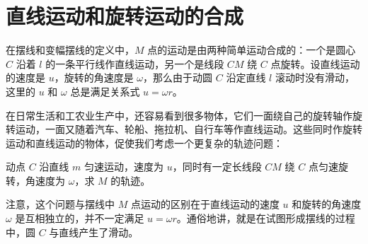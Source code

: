 \section{直线运动和旋转运动的合成}

在摆线和变幅摆线的定义中，$M$ 点的运动是由两种简单运动合成的：一个是圆心 $C$ 沿着 $l$ 的一条平行线作直线运动，另一个是线段 $CM$ 绕 $C$ 点旋转。设直线运动的速度是 $u$，旋转的角速度是 $\omega$，那么由于动圆 $C$ 沿定直线 $l$ 滚动时没有滑动，这里的 $u$ 和 $\omega$ 总是满足关系式 $u = \omega r$。

在日常生活和工农业生产中，还容易看到很多物体，它们一面绕自己的旋转轴作旋转运动，一面又随着汽车、轮船、拖拉机、自行车等作直线运动。这些同时作旋转运动和直线运动的物体，促使我们考虑一个更复杂的轨迹问题：

动点 $C$ 沿直线 $m$ 匀速运动，速度为 $u$，同时有一定长线段 $CM$ 绕 $C$ 点匀速旋转，角速度为 $\omega$，求 $M$ 的轨迹。

注意，这个问题与摆线中 $M$ 点运动的区别在于直线运动的速度 $u$ 和旋转的角速度 $\omega$ 是互相独立的，并不一定满足 $u = \omega r$。通俗地讲，就是在试图形成摆线的过程中，圆 $C$ 与直线产生了滑动。

